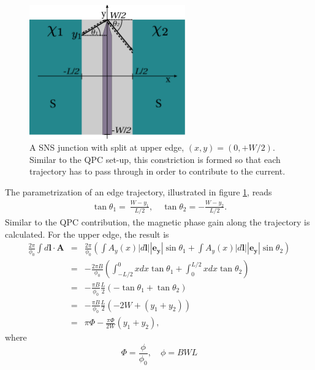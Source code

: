 \begin{figure}
\centering
\includegraphics[width=0.6\textwidth]{figure/analyticalmodel/qpc_edges_angles_csch}
\caption{A SNS junction with split at upper edge, $(x, y) = (0, + W/2)$. Similar to the QPC set-up, this constriction is formed so that each trajectory has to pass through in order to contribute to the current.}\label{fig:qpc-edge-parametrization}
\end{figure}
The parametrization of an edge trajectory, illustrated in figure \ref{fig:qpc-edge-parametrization}, reads
\begin{eqnarray}
\tan \theta_1 = ~\frac{ W - y_1}{L/2}, \quad \tan \theta_2 = -\frac{W - y_2}{L/2} \label{eq:angles-edge}.
\end{eqnarray}
Similar to the QPC contribution, the magnetic phase gain along the trajectory is calculated. For the upper edge, the result is
\begin{eqnarray}
\frac{2 \pi}{\phi_0} \int d \mathbf{l} \cdot \mathbf{A} &=& \frac{2 \pi}{\phi_0} \left( \int A_y(x) |d\mathbf{l}| |\mathbf{e_y}| \sin \theta_1 + \int A_y(x) |d\mathbf{l}| |\mathbf{e_y}| \sin \theta_2  \right)\\
&=&  - \frac{2 \pi B}{\phi_0} \left( \int_{-L/2}^{0} x dx \tan \theta_1 + \int_{0}^{L/2} x dx \tan \theta_2 \right) \\
&=&  - \frac{\pi B}{\phi_0} \frac{L}{2} \left( - \tan \theta_1 + \tan \theta_2 \right) \\
&=& - \frac{\pi B}{\phi_0} \frac{L}{2} \left( -2W + (y_1 + y_2) \right)\\
&=& \pi \Phi -\frac{\pi \Phi }{2 W} (y_1 + y_2),
\end{eqnarray}
where
\begin{equation}
\Phi = \frac{\phi}{\phi_0}, \quad \phi = B W L
\end{equation}

